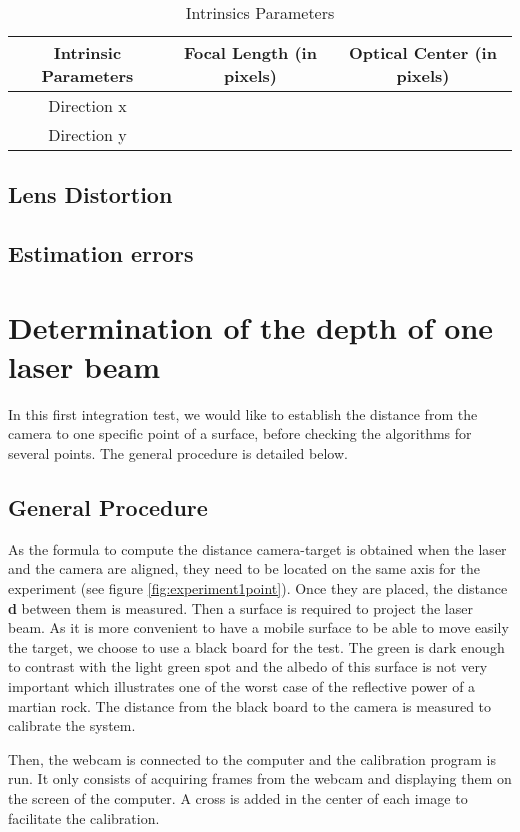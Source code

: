 \begin{table}[H]
\centering
\caption{Intrinsics Parameters}
\label{intrisicsPara}
\renewcommand{\arraystretch}{1.5}
\begin{tabular}{|c|c|c|}
\hline
Intrinsic Parameters & Focal Length (in pixels) & Optical Center (in pixels)\\ \hline
Direction x &  &  \\ \hline
Direction y &  &  \\ 
\hline
\end{tabular}
\end{table}

\subsection{Lens Distortion}

\subsection{Estimation errors}

\section{Determination of the depth of one laser beam}
In this first integration test, we would like to establish the distance from the camera to one specific point of a surface, before checking the algorithms for several points. The general procedure is detailed below. 

\subsection{General Procedure}
As the formula to compute the distance camera-target is obtained when the laser and the camera are aligned, they need to be located on the same axis for the experiment (see figure \ref{fig:experiment1point}). Once they are placed, the distance \textbf{d} between them is measured. Then a surface is required to project the laser beam. As it is more convenient to have a mobile surface to be able to move easily the target, we choose to use a black board for the test. The green is dark enough to contrast with the light green spot and the albedo of this surface is not very important which illustrates one of the worst case of the reflective power of a martian rock. The distance from the black board to the camera is measured to calibrate the system.

Then, the webcam is connected to the computer and the calibration program is run. It only consists of acquiring frames from the webcam and displaying them on the screen of the computer. A cross is added in the center of each image to facilitate the calibration. 